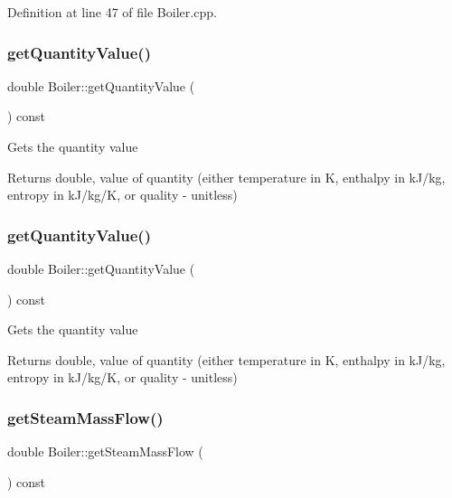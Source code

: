 Definition at line 47 of file Boiler.\+cpp.

\mbox{\label{class_boiler_a78370a174135e6cc95abcd3b7ac2f947}} 
\subsubsection{\texorpdfstring{get\+Quantity\+Value()}{getQuantityValue()}\hspace{0.1cm}{\footnotesize\ttfamily [2/3]}}
{\footnotesize\ttfamily double Boiler\+::get\+Quantity\+Value (\begin{DoxyParamCaption}{ }\end{DoxyParamCaption}) const}

Gets the quantity value \begin{DoxyReturn}{Returns}
double, value of quantity (either temperature in K, enthalpy in k\+J/kg, entropy in k\+J/kg/K, or quality -\/ unitless) 
\end{DoxyReturn}
\mbox{\label{class_boiler_a78370a174135e6cc95abcd3b7ac2f947}} 
\subsubsection{\texorpdfstring{get\+Quantity\+Value()}{getQuantityValue()}\hspace{0.1cm}{\footnotesize\ttfamily [3/3]}}
{\footnotesize\ttfamily double Boiler\+::get\+Quantity\+Value (\begin{DoxyParamCaption}{ }\end{DoxyParamCaption}) const}

Gets the quantity value \begin{DoxyReturn}{Returns}
double, value of quantity (either temperature in K, enthalpy in k\+J/kg, entropy in k\+J/kg/K, or quality -\/ unitless) 
\end{DoxyReturn}
\mbox{\label{class_boiler_a4101e71234995558a451dcab145b5fc9}} 
\subsubsection{\texorpdfstring{get\+Steam\+Mass\+Flow()}{getSteamMassFlow()}\hspace{0.1cm}{\footnotesize\ttfamily [1/3]}}
{\footnotesize\ttfamily double Boiler\+::get\+Steam\+Mass\+Flow (\begin{DoxyParamCaption}{ }\end{DoxyParamCaption}) const}

